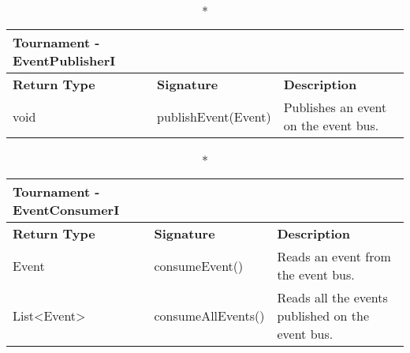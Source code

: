 	\begin{longtable}{|p{2.5cm} p{6.5cm} p{4.5cm}|}
	\caption*{Tournament - EventPublisherI}\\ 
	
	\hline
	\textbf{Return Type} & \textbf{Signature} & \textbf{Description}\\
	\hline \endhead
	
	void & publishEvent(Event)  & Publishes an event on the event bus.\\

	\hline
	
\end{longtable}


	\begin{longtable}{|p{2.5cm} p{6.5cm} p{4.5cm}|}
	\caption*{Tournament - EventConsumerI}\\ 
	
	\hline
	\textbf{Return Type} & \textbf{Signature} & \textbf{Description}\\
	\hline \endhead
	
	Event & consumeEvent()  & Reads an event from the event bus.\\
	
	List\textless Event\textgreater & consumeAllEvents() & Reads all the events published on the event bus.\\
	
	\hline
	
\end{longtable}

\pagebreak




